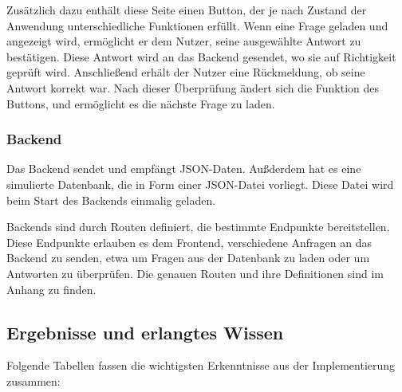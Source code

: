 \documentclass[biblatex]{lni}
\begin{document}
Zusätzlich dazu enthält diese Seite einen Button,
der je nach Zustand der Anwendung unterschiedliche Funktionen erfüllt.
Wenn eine Frage geladen und angezeigt wird, ermöglicht er dem Nutzer,
seine ausgewählte Antwort zu bestätigen.
Diese Antwort wird an das Backend gesendet, wo sie auf Richtigkeit geprüft wird.
Anschließend erhält der Nutzer eine Rückmeldung, ob seine Antwort korrekt war.
Nach dieser Überprüfung ändert sich die Funktion des Buttons, und ermöglicht es die nächste Frage zu laden.

\subsubsection{Backend}

Das Backend sendet und empfängt \ac{JSON}-Daten.
Außderdem hat es eine simulierte Datenbank, die in Form einer \ac{JSON}-Datei vorliegt.
Diese Datei wird beim Start des Backends einmalig geladen.

Backends sind durch Routen definiert, die bestimmte Endpunkte bereitstellen.
Diese Endpunkte erlauben es dem Frontend, verschiedene Anfragen an das Backend zu senden, etwa um Fragen aus der Datenbank zu laden oder um Antworten zu überprüfen.
Die genauen Routen und ihre Definitionen sind im Anhang zu finden.

\subsection{Ergebnisse und erlangtes Wissen}

Folgende Tabellen fassen die wichtigsten Erkenntnisse aus der Implementierung zusammen:
\end{document}
